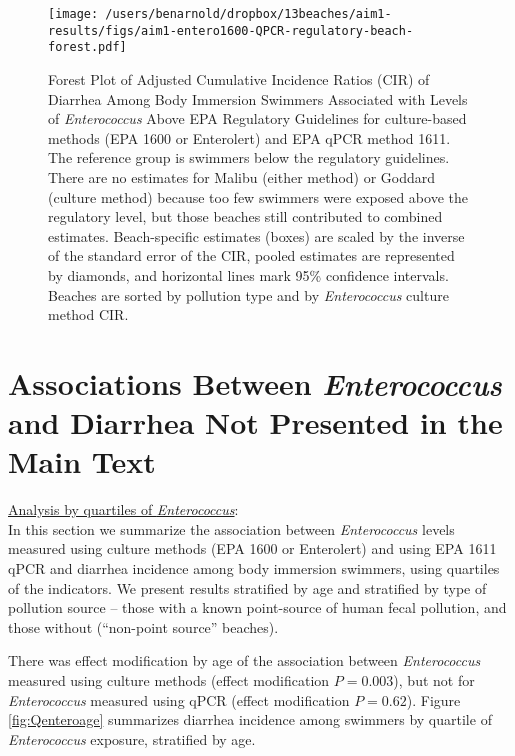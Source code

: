 \documentclass[12pt]{article}\usepackage[]{graphicx}\usepackage[]{color}
\begin{document}
\begin{landscape}
\begin{figure}[h!tb]
\begin{center}
\texttt{[image: /users/benarnold/dropbox/13beaches/aim1-results/figs/aim1-entero1600-QPCR-regulatory-beach-forest.pdf]}
\caption{Forest Plot of Adjusted Cumulative Incidence Ratios (CIR) of Diarrhea Among Body Immersion Swimmers Associated with  Levels of \emph{Enterococcus} Above EPA Regulatory Guidelines for culture-based methods (EPA 1600 or Enterolert) and EPA qPCR method 1611. The reference group is swimmers below the regulatory guidelines. There are no estimates for Malibu (either method) or Goddard (culture method) because too few swimmers were exposed above the regulatory level, but those beaches still contributed to combined estimates. Beach-specific estimates (boxes) are scaled by the inverse of the standard error of the CIR, pooled estimates are represented by diamonds, and horizontal lines mark 95\% confidence intervals. Beaches are sorted by pollution type and by \textit{Enterococcus} culture method CIR.\label{fig:enteroregforest}}
\end{center}
\end{figure}
\end{landscape}

\clearpage
\section{Associations Between \emph{Enterococcus} and Diarrhea Not Presented in the Main Text}

\underline{Analysis by quartiles of \textit{Enterococcus}}: \\
In this section we summarize the association between \emph{Enterococcus} levels measured using culture methods (EPA 1600 or Enterolert) and using EPA 1611 qPCR and diarrhea incidence among body immersion swimmers, using quartiles of the indicators.  We present results stratified by age and stratified by type of pollution source -- those with a known point-source of human fecal pollution, and those without (``non-point source'' beaches).  

There was effect modification by age of the association between \textit{Enterococcus} measured using culture methods (effect modification $P=0.003$), but not for \textit{Enterococcus} measured using qPCR (effect modification $P=0.62$).  Figure  \ref{fig:Qenteroage} summarizes diarrhea incidence among swimmers by quartile of \textit{Enterococcus} exposure, stratified by age.
\end{document}
